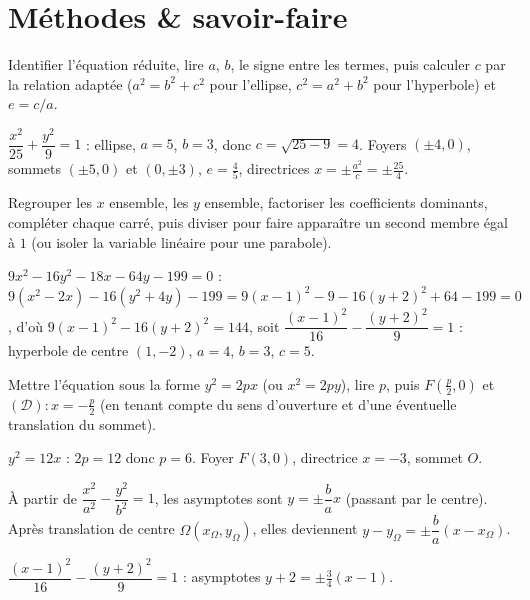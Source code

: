 \section{Méthodes \& savoir-faire}

Identifier l'équation réduite, lire $a$, $b$, le signe entre les termes, puis calculer
$c$ par la relation adaptée ($a^2=b^2+c^2$ pour l'ellipse, $c^2=a^2+b^2$ pour
l'hyperbole) et $e=c/a$.
\begin{exemple}
$\dfrac{x^{2}}{25}+\dfrac{y^{2}}{9}=1$ : ellipse, $a=5$, $b=3$, donc
$c=\sqrt{25-9}=4$. Foyers $(\pm4,0)$, sommets $(\pm5,0)$ et $(0,\pm3)$,
$e=\tfrac45$, directrices $x=\pm\tfrac{a^2}c=\pm\tfrac{25}4$.
\end{exemple}

Regrouper les $x$ ensemble, les $y$ ensemble, factoriser les coefficients dominants,
compléter chaque carré, puis diviser pour faire apparaître un second membre égal à $1$ (ou
isoler la variable linéaire pour une parabole).
\begin{exemple}
$9x^{2}-16y^{2}-18x-64y-199=0$ :
$9(x^{2}-2x)-16(y^{2}+4y)-199=9(x-1)^{2}-9-16(y+2)^{2}+64-199=0$,
d'où $9(x-1)^{2}-16(y+2)^{2}=144$, soit
$\dfrac{(x-1)^{2}}{16}-\dfrac{(y+2)^{2}}{9}=1$ : hyperbole de centre $(1,-2)$,
$a=4$, $b=3$, $c=5$.
\end{exemple}

Mettre l'équation sous la forme $y^{2}=2px$ (ou $x^{2}=2py$), lire $p$, puis
$F\!\left(\tfrac p2,0\right)$ et $(\mathcal D):x=-\tfrac p2$ (en tenant compte du sens
d'ouverture et d'une éventuelle translation du sommet).
\begin{exemple}
$y^{2}=12x$ : $2p=12$ donc $p=6$. Foyer $F(3,0)$, directrice $x=-3$, sommet $O$.
\end{exemple}

À partir de $\dfrac{x^2}{a^2}-\dfrac{y^2}{b^2}=1$, les asymptotes sont $y=\pm\dfrac ba x$
(passant par le centre). Après translation de centre $\Omega(x_\Omega,y_\Omega)$, elles
deviennent $y-y_\Omega=\pm\dfrac ba(x-x_\Omega)$.
\begin{exemple}
$\dfrac{(x-1)^{2}}{16}-\dfrac{(y+2)^{2}}{9}=1$ : asymptotes
$y+2=\pm\tfrac34(x-1)$.
\end{exemple}

